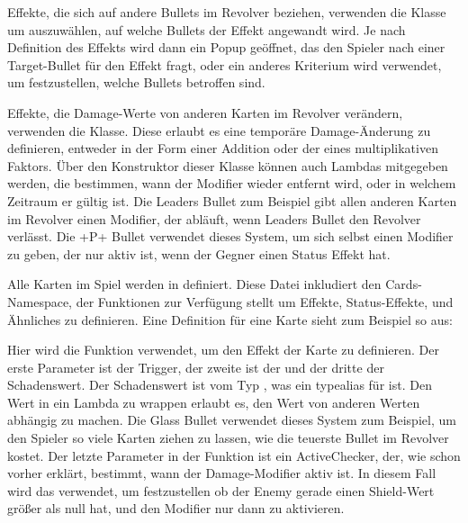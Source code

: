 Effekte, die sich auf andere Bullets im Revolver beziehen, verwenden die  Klasse um
auszuwählen, auf welche Bullets der Effekt angewandt wird.
Je nach Definition des Effekts wird dann ein Popup geöffnet, das den Spieler nach einer Target-Bullet für den Effekt
fragt, oder ein anderes Kriterium wird verwendet, um festzustellen, welche Bullets betroffen sind.

Effekte, die Damage-Werte von anderen Karten im Revolver verändern, verwenden die 
Klasse.
Diese erlaubt es eine temporäre Damage-Änderung zu definieren, entweder in der Form einer Addition oder der eines
multiplikativen Faktors.
Über den Konstruktor dieser Klasse können auch Lambdas mitgegeben werden, die bestimmen, wann der Modifier wieder
entfernt wird, oder in welchem Zeitraum er gültig ist.
Die Leaders Bullet zum Beispiel gibt allen anderen Karten im Revolver einen Modifier, der abläuft, wenn Leaders Bullet
den Revolver verlässt.
Die +P+ Bullet verwendet dieses System, um sich selbst einen Modifier zu geben, der nur aktiv ist, wenn der Gegner einen
Status Effekt hat.

Alle Karten im Spiel werden in  definiert.
Diese Datei inkludiert den Cards-Namespace, der Funktionen zur Verfügung stellt um Effekte, Status-Effekte, und
Ähnliches zu definieren.
Eine Definition für eine Karte sieht zum Beispiel so aus:


Hier wird die  Funktion verwendet, um den Effekt der Karte zu definieren.
Der erste Parameter ist der Trigger, der zweite ist der  und der dritte der Schadenswert.
Der Schadenswert ist vom Typ , was ein typealias für
 ist.
Den Wert in ein Lambda zu wrappen erlaubt es, den Wert von anderen Werten abhängig zu machen.
Die Glass Bullet verwendet dieses System zum Beispiel, um den Spieler so viele Karten ziehen zu lassen, wie die teuerste
Bullet im Revolver kostet.
Der letzte Parameter in der  Funktion ist ein ActiveChecker, der, wie schon vorher erklärt,
bestimmt, wann der Damage-Modifier aktiv ist.
In diesem Fall wird das   verwendet, um
festzustellen ob der Enemy gerade einen Shield-Wert größer als null hat, und den Modifier nur dann zu aktivieren.

\renewcommand{\kapitelautor}{}

